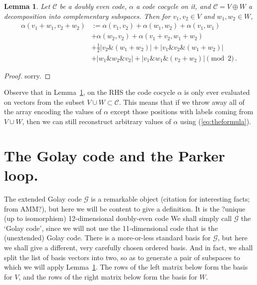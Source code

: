 \documentclass{article}
\theoremstyle{plain}
\newtheorem{lemma}{Lemma}
\theoremstyle{definition}
\def \cC {\mathcal{C}}
\def \cG {\mathcal{G}}
\def\And{\mathbin{\&}}
\def\Plus{+}
\begin{document}
\begin{lemma}\label{lemma:formula lemma}
Let $\cC$ be a doubly even code, $\alpha$ a code cocycle on it, and $\cC = V\oplus W$ a decomposition into complementary subspaces.
Then for $v_1,v_2\in V$ and $w_1,w_2\in W$,
\begin{align}\label{eq:theformula}
	\alpha(v_1\Plus w_1,v_2\Plus w_2)	
		& := \alpha(v_1,v_2)  + \alpha(w_1,w_2) + \alpha(v_1,w_1) \\
		&+ \alpha(w_2,v_2) + \alpha(v_1\Plus v_2,w_1\Plus w_2)\\
							& + \tfrac12|v_2\And(w_1\Plus w_2)| + |v_1\And v_2 \And (w_1\Plus w_2)| \\
							&+|w_1\And w_2 \And v_2| + \left|v_1\And w_1 \And (v_2 \Plus  w_2)\right| \pmod 2\,.
\end{align}
\end{lemma}

\begin{proof}
sorry.
\end{proof}

Observe that in Lemma~\ref{lemma:formula lemma}, on the RHS the code cocycle $\alpha$ is only ever evaluated on vectors from the subset $V \cup W \subset \cC$.
This means that if we throw away all of the array encoding the values of $\alpha$ except those positions with labels coming from $V\cup W$, then we can still reconstruct arbitrary values of $\alpha$ using (\ref{eq:theformula}).

\section{The Golay code and the Parker loop.}

The extended Golay code $\cG$ is a remarkable object (citation for interesting facts; from AMM?), but here we will be content to give a definition. 
It is the ?unique (up to isomorphism) 12-dimensional doubly-even code
We shall simply call $\cG$ the `Golay code', since we will not use the 11-dimensional code that is the (unextended) Golay code.
There is a more-or-less standard basis for $\cG$, but here we shall give a different, very carefully chosen ordered basis.
And in fact, we shall split the list of basis vectors into two, so as to generate a pair of subspaces to which we will apply Lemma~\ref{lemma:formula lemma}.
The rows of the left matrix below form the basis for $V$, and the rows of the right matrix below form the basis for $W$.
\end{document}
